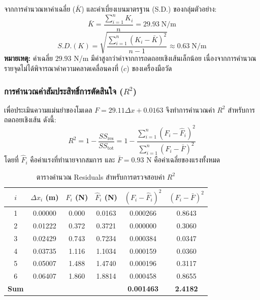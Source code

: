 จากการคำนวณหาค่าเฉลี่ย ($\bar{K}$) และค่าเบี่ยงเบนมาตรฐาน (S.D.) ของกลุ่มตัวอย่าง:
\begin{equation}
    \bar{K} = \frac{\sum_{i=1}^{n} K_i}{n} = 29.93 \; \text{N/m}
\end{equation}
\begin{equation}
    S.D.(K) = \sqrt{\frac{\sum_{i=1}^{n} (K_i - \bar{K})^2}{n-1}} \approx 0.63 \; \text{N/m}
\end{equation}
\textbf{หมายเหตุ:} ค่าเฉลี่ย $29.93$ N/m มีค่าสูงกว่าค่าจากการถดถอยเชิงเส้นเล็กน้อย เนื่องจากการคำนวณรายจุดไม่ได้พิจารณาค่าความคลาดเคลื่อนคงที่ ($c$) ของเครื่องมือวัด

\subsubsection{การคำนวณค่าสัมประสิทธิ์การตัดสินใจ (\texorpdfstring{$R^2$}{R^2})}

เพื่อประเมินความแม่นยำของโมเดล $F = 29.11 \Delta x + 0.0163$ จึงทำการคำนวณค่า $R^2$ สำหรับการถดถอยเชิงเส้น ดังนี้:
\begin{equation}
    R^2 = 1 - \frac{SS_{\text{res}}}{SS_{\text{tot}}} = 1 - \frac{\sum_{i=1}^{n} (F_i - \hat{F}_i)^2}{\sum_{i=1}^{n} (F_i - \bar{F})^2}
\end{equation}
โดยที่ $\hat{F}_i$ คือค่าแรงที่ทำนายจากสมการ และ $\bar{F} = 0.93$ N คือค่าเฉลี่ยของแรงทั้งหมด

\begin{table}[ht]
    \centering
    \caption{ตารางคำนวณ Residuals สำหรับการตรวจสอบค่า $R^2$}
    \label{tab:r2_calc}
    \begin{tabular}{cccccc}
        \hline
        $i$ & $\Delta x_i$ (m) & $F_i$ (N) & $\hat{F}_i$ (N) & $(F_i - \hat{F}_i)^2$ & $(F_i - \bar{F})^2$ \\
        \hline
        1 & 0.00000 & 0.000 & 0.0163 & 0.000266 & 0.8643 \\
        2 & 0.01222 & 0.372 & 0.3721 & 0.000000 & 0.3060 \\
        3 & 0.02429 & 0.743 & 0.7234 & 0.000384 & 0.0347 \\
        4 & 0.03735 & 1.116 & 1.1034 & 0.000159 & 0.0360 \\
        5 & 0.05007 & 1.488 & 1.4740 & 0.000196 & 0.3117 \\
        6 & 0.06407 & 1.860 & 1.8814 & 0.000458 & 0.8655 \\
        \hline
        \textbf{Sum} & & & & \textbf{0.001463} & \textbf{2.4182} \\
        \hline
    \end{tabular}
\end{table}

